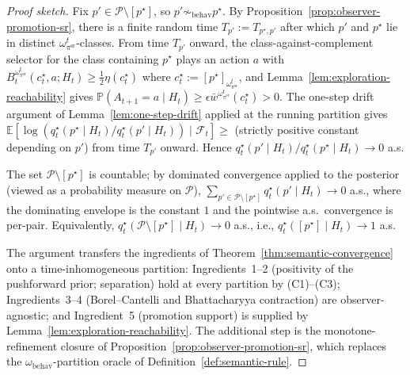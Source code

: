 \documentclass[11pt]{article}
\theoremstyle{definition}
\theoremstyle{remark}
\newcommand{\Pcal}{\mathcal{P}}
\newcommand{\E}{\mathbb{E}}
\newcommand{\Prob}{\mathbb{P}}
\begin{document}
\begin{proof}[Proof sketch]
Fix $p'\in\Pcal\setminus[p^\star]$, so $p'\not\sim_{\mathrm{behav}}p^\star$. By Proposition~\ref{prop:observer-promotion-sr}, there is a finite random time $T_{p'}:=T_{p^\star,p'}$ after which $p'$ and $p^\star$ lie in distinct $\omega_{\pi^{\mathrm{sr}}}^t$-classes. From time $T_{p'}$ onward, the class-against-complement selector for the class containing $p^\star$ plays an action $a$ with $B_t^{\omega_{\pi^{\mathrm{sr}}}^t}(c^\star_t,a;H_t)\ge\tfrac{1}{2}\eta(c^\star_t)$ where $c^\star_t:=[p^\star]_{\omega_{\pi^{\mathrm{sr}}}^t}$, and Lemma~\ref{lem:exploration-reachability} gives $\Prob(A_{t+1}=a\mid H_t)\ge\epsilon\bar w^{\omega_{\pi^{\mathrm{sr}}}^t}(c^\star_t)>0$. The one-step drift argument of Lemma~\ref{lem:one-step-drift} applied at the running partition gives $\E[\log(q_t^\star(p^\star\mid H_t)/q_t^\star(p'\mid H_t))\mid\mathcal F_t]\ge$ (strictly positive constant depending on $p'$) from time $T_{p'}$ onward. Hence $q_t^\star(p'\mid H_t)/q_t^\star(p^\star\mid H_t)\to 0$ a.s.

The set $\Pcal\setminus[p^\star]$ is countable; by dominated convergence applied to the posterior (viewed as a probability measure on $\Pcal$), $\sum_{p'\in\Pcal\setminus[p^\star]}q_t^\star(p'\mid H_t)\to 0$ a.s., where the dominating envelope is the constant $1$ and the pointwise a.s.\ convergence is per-pair. Equivalently, $q_t^\star(\Pcal\setminus[p^\star]\mid H_t)\to 0$ a.s., i.e., $q_t^\star([p^\star]\mid H_t)\to 1$ a.s.

The argument transfers the ingredients of Theorem~\ref{thm:semantic-convergence} onto a time-inhomogeneous partition: Ingredients~1--2 (positivity of the pushforward prior; separation) hold at every partition by (C1)--(C3); Ingredients~3--4 (Borel--Cantelli and Bhattacharyya contraction) are observer-agnostic; and Ingredient~5 (promotion support) is supplied by Lemma~\ref{lem:exploration-reachability}. The additional step is the monotone-refinement closure of Proposition~\ref{prop:observer-promotion-sr}, which replaces the $\omega_{\mathrm{behav}}$-partition oracle of Definition~\ref{def:semantic-rule}.
\end{proof}
\end{document}
